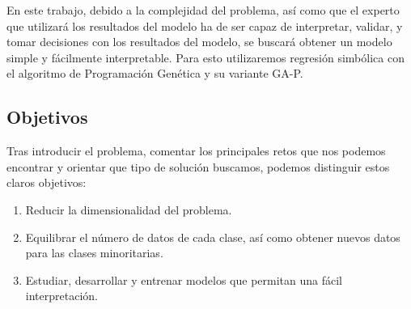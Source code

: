 En este trabajo, debido a la complejidad del problema, así como que el experto que utilizará los resultados del modelo ha de ser capaz de interpretar, validar, y tomar decisiones con los resultados del modelo, se buscará obtener un modelo simple y fácilmente interpretable. Para esto utilizaremos regresión simbólica con el algoritmo de Programación Genética y su variante GA-P.


\subsection{Objetivos}

Tras introducir el problema, comentar los principales retos que nos podemos encontrar y orientar que tipo de solución buscamos, podemos distinguir estos claros objetivos:

\begin{enumerate}
	\item Reducir la dimensionalidad del problema.
	\item Equilibrar el número de datos de cada clase, así como obtener nuevos datos para las clases minoritarias.
	\item Estudiar, desarrollar y entrenar modelos que permitan una fácil interpretación.
\end{enumerate}


\newpage
